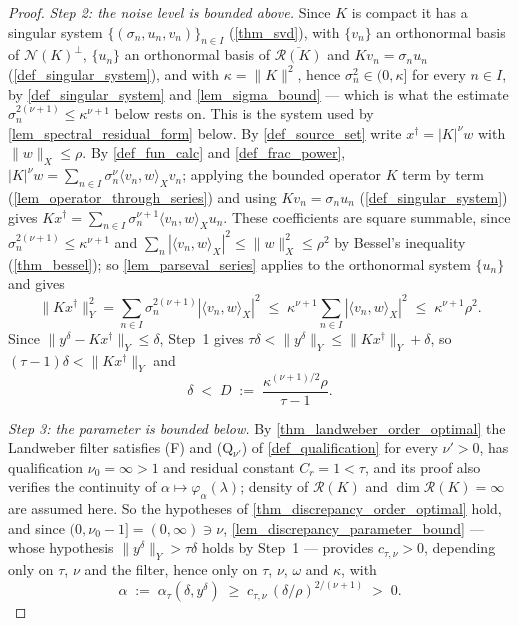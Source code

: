 \documentclass[a4paper]{report}
\theoremstyle{plain}
\theoremstyle{definition}
\theoremstyle{remark}
\newcommand{\Ran}{\mathcal{R}}
\newcommand{\Ker}{\mathcal{N}}
\newcommand{\dg}{^{\dagger}}
\begin{document}
\begin{proof}
  \emph{Step 2: the noise level is bounded above.}  Since $K$ is compact it has a
  singular system $\{(\sigma_n,u_n,v_n)\}_{n \in I}$ (\cref{thm_svd}), with $\{v_n\}$ an
  orthonormal basis of $\Ker(K)^{\perp}$, $\{u_n\}$ an orthonormal basis of
  $\overline{\Ran(K)}$ and $Kv_n = \sigma_nu_n$ (\cref{def_singular_system}), and with
  $\kappa = \|K\|^{2}$, hence $\sigma_n^{2} \in (0,\kappa]$ for every
  $n \in I$, by \cref{def_singular_system} and \cref{lem_sigma_bound} --- which is what
  the estimate $\sigma_n^{2(\nu+1)} \le \kappa^{\nu+1}$ below
  rests on.  This is the system used by
  \cref{lem_spectral_residual_form} below.  By \cref{def_source_set} write
  $x\dg = |K|^{\nu}w$ with $\|w\|_X \le \rho$.  By \cref{def_fun_calc} and
  \cref{def_frac_power}, $|K|^{\nu}w = \sum_{n \in I}\sigma_n^{\nu}\langle v_n,w\rangle_Xv_n$;
  applying the bounded operator $K$ term by term (\cref{lem_operator_through_series}) and
  using $Kv_n = \sigma_nu_n$ (\cref{def_singular_system}) gives
  $Kx\dg = \sum_{n \in I}\sigma_n^{\nu+1}\langle v_n,w\rangle_Xu_n$.  These coefficients
  are square summable, since $\sigma_n^{2(\nu+1)} \le \kappa^{\nu+1}$ and
  $\sum_{n}|\langle v_n,w\rangle_X|^{2} \le \|w\|_X^{2} \le \rho^{2}$ by Bessel's
  inequality (\cref{thm_bessel}); so \cref{lem_parseval_series} applies to the orthonormal
  system $\{u_n\}$ and gives
  \[
    \|Kx\dg\|_Y^{2} = \sum_{n \in I}\sigma_n^{2(\nu+1)}|\langle v_n,w\rangle_X|^{2}
      \;\le\; \kappa^{\nu+1}\sum_{n \in I}|\langle v_n,w\rangle_X|^{2}
      \;\le\; \kappa^{\nu+1}\rho^{2} .
  \]
  Since $\|y^{\delta} - Kx\dg\|_Y \le \delta$, Step~1 gives $\tau\delta <
  \|y^{\delta}\|_Y \le \|Kx\dg\|_Y + \delta$, so $(\tau-1)\delta < \|Kx\dg\|_Y$ and
  \begin{equation}\label{eq_lw_delta_small}
    \delta \;<\; D \;:=\; \frac{\kappa^{(\nu+1)/2}\rho}{\tau - 1} .
  \end{equation}

  \emph{Step 3: the parameter is bounded below.}  By
  \cref{thm_landweber_order_optimal} the Landweber filter satisfies (F) and
  (Q$_{\nu'}$) of \cref{def_qualification} for every $\nu' > 0$, has qualification
  $\nu_0 = \infty > 1$ and residual constant $C_r = 1 < \tau$, and its proof also
  verifies the continuity of $\alpha \mapsto \varphi_{\alpha}(\lambda)$; density of
  $\Ran(K)$ and $\dim\Ran(K) = \infty$ are assumed here.  So the hypotheses of
  \cref{thm_discrepancy_order_optimal} hold, and since $(0,\nu_0-1] = (0,\infty) \ni \nu$,
  \cref{lem_discrepancy_parameter_bound} --- whose hypothesis
  $\|y^{\delta}\|_Y > \tau\delta$ holds by Step~1 --- provides $c_{\tau,\nu} > 0$,
  depending only on $\tau$, $\nu$ and the filter, hence only on $\tau$, $\nu$, $\omega$
  and $\kappa$, with
  \begin{equation}\label{eq_lw_alpha_lower}
    \alpha \;:=\; \alpha_{\tau}(\delta,y^{\delta})
      \;\ge\; c_{\tau,\nu}\,(\delta/\rho)^{2/(\nu+1)} \;>\; 0 .
  \end{equation}


\end{proof}
\end{document}
